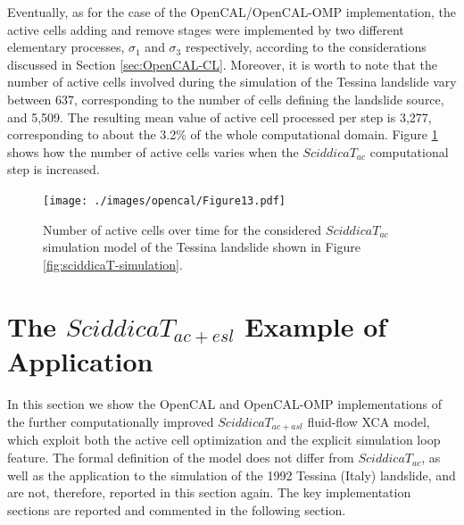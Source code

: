 Eventually, as for the case of the OpenCAL/OpenCAL-OMP
implementation, the active cells adding and remove stages were
implemented by two different elementary processes, $\sigma_1$ and
$\sigma_3$ respectively, according to the considerations discussed
in Section \ref{sec:OpenCAL-CL}. Moreover, it is worth to note
that the number of active cells involved during the simulation of
the Tessina landslide vary between 637, corresponding to the
number of cells defining the landslide source, and 5,509. The
resulting mean value of active cell processed per step is 3,277,
corresponding to about the 3.2\% of the whole computational
domain. Figure \ref{gr:active_cells_count} shows how the number of
active cells varies when the $SciddicaT_{ac}$ computational step
is increased.

\begin{figure}
	\begin{center}
		\texttt{[image: ./images/opencal/Figure13.pdf]}
		\caption{Number of active cells over time for the considered $SciddicaT_{ac}$ simulation model of the Tessina landslide shown in Figure \ref{fig:sciddicaT-simulation}.}
		\label{gr:active_cells_count}
	\end{center}
\end{figure}

\section{The $SciddicaT_{ac+esl}$ Example of Application}
\label{sec:SciddicaT-ac+esl}

In this section we show the OpenCAL and OpenCAL-OMP implementations
of the further computationally improved $SciddicaT_{ac+asl}$
fluid-flow XCA model, which exploit both the active cell
optimization and the explicit simulation loop feature. The formal definition of the model does not differ from $SciddicaT_{ac}$, as well as
the application to the simulation of the 1992 Tessina (Italy)
landslide, and are not, therefore, reported in this section again.
The key implementation sections are reported and commented in the following section.

